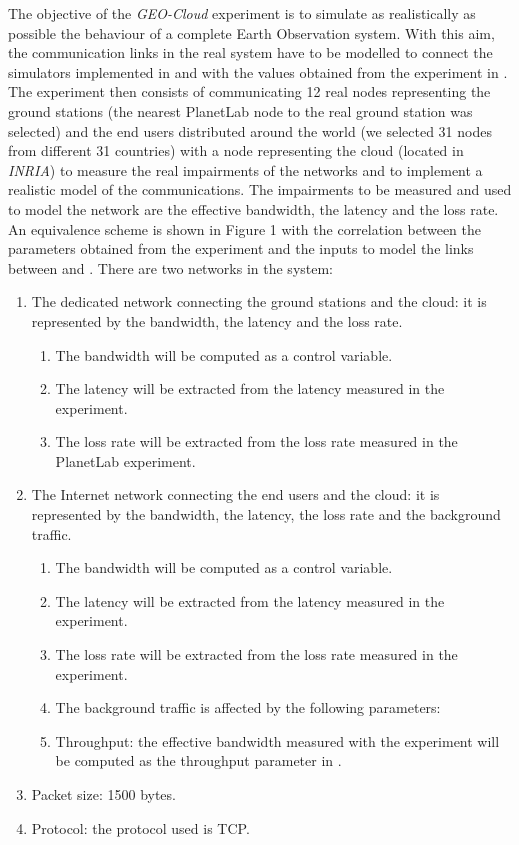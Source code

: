 The objective of the \emph{GEO-Cloud} experiment is to simulate as realistically as possible the behaviour of a complete Earth Observation system. With this aim, the communication links in the real system have to be modelled to connect the simulators implemented in \vw and \bonfire with the values obtained from the experiment in \pl. The experiment then consists of communicating 12 real nodes representing the ground stations (the nearest PlanetLab node to the real ground station was selected) and the end users distributed around the world (we selected 31 nodes from different 31 countries) with a node representing the cloud (located in \emph{INRIA}) to measure the real impairments of the networks and to implement a realistic model of the communications. The impairments to be measured and used to model the network are the effective bandwidth, the latency and the loss rate.
An equivalence scheme is shown in Figure 1 with the correlation between the
parameters obtained from the experiment and the inputs to model the links
between \vw and \bonfire.  There are two networks in the system: 
\begin{enumerate}
\item	The dedicated network connecting the ground stations and the cloud: it
  is represented by the bandwidth, the latency and the loss rate. 
\begin{enumerate}
\item The bandwidth will be computed as a control variable.
\item The latency will be extracted from the latency measured in the \pl experiment.
\item The loss rate will be extracted from the loss rate measured in the PlanetLab experiment.
 \end{enumerate}
\item	The Internet network connecting the end users and the cloud: it is
  represented by the bandwidth, the latency, the loss rate and the background
  traffic.
\begin{enumerate}
\item The bandwidth will be computed as a control variable.
\item The latency will be extracted from the latency measured in the \pl experiment.
\item The loss rate will be extracted from the loss rate measured in the \pl experiment.
\item The background traffic is affected by the following parameters:
\item Throughput: the effective bandwidth measured with the \pl
experiment will be computed as the throughput parameter in \vw.
\end{enumerate}

\item Packet size: 1500 bytes.
\item Protocol: the protocol used is TCP.
\end{enumerate}

